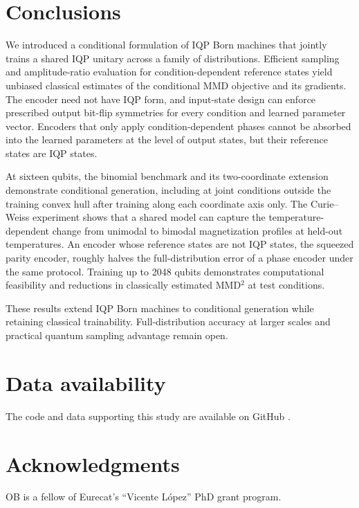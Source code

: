 \documentclass[pra,aps,10pt,twocolumn,floatfix,superscriptaddress, notitlepage,longbibliography]{revtex4-2}
\begin{document}
\section{Conclusions}
\label{sec:conclusions}

We introduced a conditional formulation of IQP Born machines that jointly trains a shared IQP unitary across a family of distributions. Efficient sampling and amplitude-ratio evaluation for condition-dependent reference states yield unbiased classical estimates of the conditional MMD objective and its gradients. The encoder need not have IQP form, and input-state design can enforce prescribed output bit-flip symmetries for every condition and learned parameter vector. Encoders that only apply condition-dependent phases cannot be absorbed into the learned parameters at the level of output states, but their reference states are IQP states.

At sixteen qubits, the binomial benchmark and its two-coordinate extension demonstrate conditional generation, including at joint conditions outside the training convex hull after training along each coordinate axis only. The Curie--Weiss experiment shows that a shared model can capture the temperature-dependent change from unimodal to bimodal magnetization profiles at held-out temperatures. An encoder whose reference states are not IQP states, the squeezed parity encoder, roughly halves the full-distribution error of a phase encoder under the same protocol. Training up to 2048 qubits demonstrates computational feasibility and reductions in classically estimated MMD$^2$ at test conditions.

These results extend IQP Born machines to conditional generation while retaining classical trainability. Full-distribution accuracy at larger scales and practical quantum sampling advantage remain open.

\section*{Data availability}
The code and data supporting this study are available on GitHub \cite{balloConditionalGenerationIQP2026}.

\section*{Acknowledgments}
OB is a fellow of Eurecat’s ``Vicente L\'opez'' PhD grant program.


\end{document}
